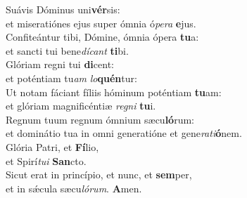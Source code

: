 \evenverse Suávis Dóminus uni\textbf{vér}sis:~\*\\
\evenverse et miseratiónes ejus super ómnia ó\textit{pe}\textit{ra} \textbf{e}jus.\\
\oddverse Confiteántur tibi, Dómine, ómnia ópera \textbf{tu}a:~\*\\
\oddverse et sancti tui bene\textit{dí}\textit{cant} \textbf{ti}bi.\\
\evenverse Glóriam regni tui \textbf{di}cent:~\*\\
\evenverse et poténtiam tu\textit{am} \textit{lo}\textbf{quén}tur:\\
\oddverse Ut notam fáciant fíliis hóminum poténtiam \textbf{tu}am:~\*\\
\oddverse et glóriam magnificéntiæ \textit{re}\textit{gni} \textbf{tu}i.\\
\evenverse Regnum tuum regnum ómnium sæcu\textbf{ló}rum:~\*\\
\evenverse et dominátio tua in omni generatióne et gene\textit{ra}\textit{ti}\textbf{ó}nem.\\
\oddverse Glória Patri, et \textbf{Fí}lio,~\*\\
\oddverse et Spirí\textit{tu}\textit{i} \textbf{San}cto.\\
\evenverse Sicut erat in princípio, et nunc, et \textbf{sem}per,~\*\\
\evenverse et in sǽcula sæcu\textit{ló}\textit{rum}. \textbf{A}men.\\
